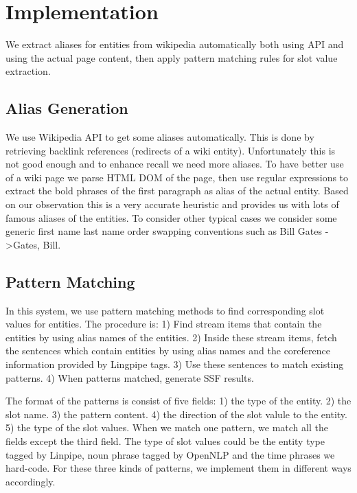 

\section{Implementation}

We extract aliases for entities from wikipedia automatically both using API and using the actual page content, then apply pattern matching rules for slot value extraction. 

\subsection{Alias Generation}

We use Wikipedia API to get some aliases automatically. This is done by retrieving backlink references (redirects of a wiki entity). Unfortunately this is not good enough and to enhance recall we need more aliases. To have better use of a wiki page we parse HTML DOM of the page, then use regular expressions to extract the bold phrases of the first paragraph as alias of the actual entity. Based on our observation this is a very accurate heuristic and provides us with lots of famous aliases of the entities. To consider other typical cases we consider some generic first name last name order swapping conventions such as Bill Gates -\textgreater Gates, Bill.  

\subsection{Pattern Matching}

In this system, we use pattern matching methods to find corresponding slot values for entities. The procedure is: 1) Find stream items that contain the entities by using alias names of the entities. 2) Inside these stream items, fetch the sentences which contain entities by using alias names and the coreference information provided by Lingpipe tags. 3) Use these sentences to match existing patterns. 4) When patterns matched, generate SSF results.

The format of the patterns is consist of five fields: 1) the type of the entity. 2) the slot name. 3) the pattern content. 4) the direction of the slot valule to the entity. 5) the type of the slot values. When we match one pattern, we match all the fields except the third field. The type of slot values could be the entity type tagged by Linpipe, noun phrase tagged by OpenNLP and the time phrases we hard-code. For these three kinds of patterns, we implement them in different ways accordingly. 

